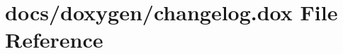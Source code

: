 \hypertarget{changelog_8dox}{\section{docs/doxygen/changelog.dox File Reference}
\label{changelog_8dox}
}
